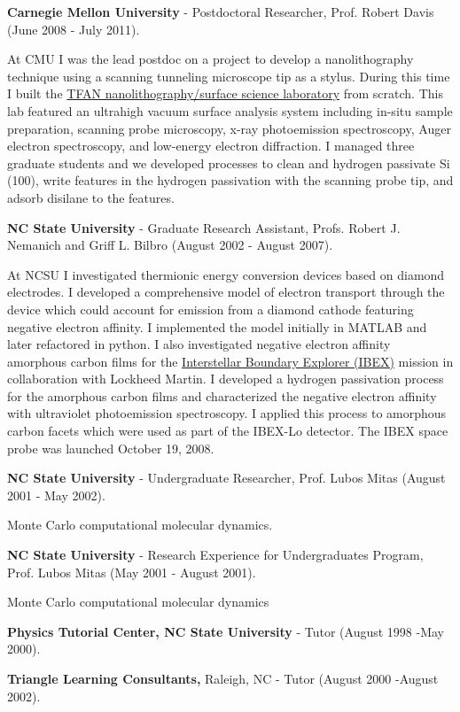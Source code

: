 \textbf{Carnegie Mellon University} - Postdoctoral Researcher, Prof.
Robert Davis (June 2008 - July 2011).

At CMU I was the lead postdoc on a project to develop a nanolithography
technique using a scanning tunneling microscope tip as a stylus. During
this time I built the \href{https://www.flickr.com/groups/tfan/}{TFAN
nanolithography/surface science laboratory} from scratch. This lab
featured an ultrahigh vacuum surface analysis system including in-situ
sample preparation, scanning probe microscopy, x-ray photoemission
spectroscopy, Auger electron spectroscopy, and low-energy electron
diffraction. I managed three graduate students and we developed
processes to clean and hydrogen passivate Si (100), write features in
the hydrogen passivation with the scanning probe tip, and adsorb
disilane to the features.

\textbf{NC State University} - Graduate Research Assistant, Profs.
Robert J. Nemanich and Griff L. Bilbro (August 2002 - August 2007).

At NCSU I investigated thermionic energy conversion devices based on
diamond electrodes. I developed a comprehensive model of electron
transport through the device which could account for emission from a
diamond cathode featuring negative electron affinity. I implemented the
model initially in MATLAB and later refactored in python. I also
investigated negative electron affinity amorphous carbon films for the
\href{http://www.nasa.gov/mission_pages/ibex/index.html}{Interstellar
Boundary Explorer (IBEX)} mission in collaboration with Lockheed Martin.
I developed a hydrogen passivation process for the amorphous carbon
films and characterized the negative electron affinity with ultraviolet
photoemission spectroscopy. I applied this process to amorphous carbon
facets which were used as part of the IBEX-Lo detector. The IBEX space
probe was launched October 19, 2008.

\textbf{NC State University} - Undergraduate Researcher, Prof. Lubos
Mitas (August 2001 - May 2002).

Monte Carlo computational molecular dynamics.

\textbf{NC State University} - Research Experience for Undergraduates
Program, Prof. Lubos Mitas (May 2001 - August 2001).

Monte Carlo computational molecular dynamics

\textbf{Physics Tutorial Center, NC State University} - Tutor (August
1998 -May 2000).

\textbf{Triangle Learning Consultants,} Raleigh, NC - Tutor (August 2000
-August 2002).

